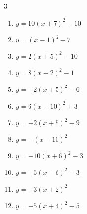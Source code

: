 \begin{multicols}{3}
\begin{enumerate}
  \item $\displaystyle y=10\left( x+7\right)^{2}-10$

        \phantom{$\displaystyle 頂点\left( -7 , -10 \right)$}

  \item $\displaystyle y=\left( x-1\right)^{2}-7$

        \phantom{$\displaystyle 頂点\left( 1 , -7 \right)$}

  \item $\displaystyle y=2\left( x+5\right)^{2}-10$

        \phantom{$\displaystyle 頂点\left( -5 , -10 \right)$}

  \item $\displaystyle y=8\left( x-2\right)^{2}-1$

        \phantom{$\displaystyle 頂点\left( 2 , -1 \right)$}

  \item $\displaystyle y=-2\left( x+5\right)^{2}-6$

        \phantom{$\displaystyle 頂点\left( -5 , -6 \right)$}

  \item $\displaystyle y=6\left( x-10\right)^{2}+3$

        \phantom{$\displaystyle 頂点\left( 10 , 3 \right)$}

  \item $\displaystyle y=-2\left( x+5\right)^{2}-9$

        \phantom{$\displaystyle 頂点\left( -5 , -9 \right)$}

  \item $\displaystyle y=-\left( x-10\right)^{2}$

        \phantom{$\displaystyle 頂点\left( 10 , 0 \right)$}

  \item $\displaystyle y=-10\left( x+6\right)^{2}-3$

        \phantom{$\displaystyle 頂点\left( -6 , -3 \right)$}

  \item $\displaystyle y=-5\left( x-6\right)^{2}-3$

        \phantom{$\displaystyle 頂点\left( 6 , -3 \right)$}

  \item $\displaystyle y=-3\left( x+2\right)^{2}$

        \phantom{$\displaystyle 頂点\left( -2 , 0 \right)$}

  \item $\displaystyle y=-5\left( x+4\right)^{2}-5$


\end{enumerate}
\end{multicols}
